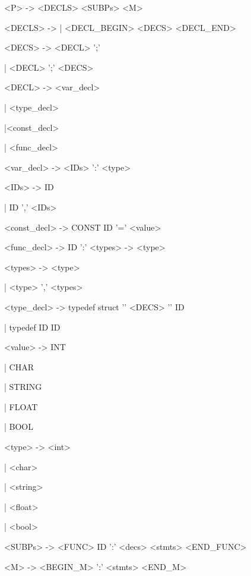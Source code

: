<P> -> <DECLS> <SUBPs> <M>

<DECLS> -> | <DECL\_BEGIN> <DECS> <DECL\_END>

<DECS> -> <DECL> ';' 

\hspace{2cm}| <DECL> ';' <DECS>

<DECL> -> <var\_decl> 

\hspace{2cm}| <type\_decl> 

\hspace{2cm}|<const\_decl> 

\hspace{2cm}| <func\_decl> 


<var\_decl> ->  <IDs> ':' <type> 

<IDs> -> ID 

\hspace{2cm}| ID ',' <IDs>

<const\_decl> -> CONST ID '=' <value> 

<func\_decl> -> ID ':' <types> -> <type> 

<types> -> <type>

\hspace{2cm}| <type> ',' <types> 

<type\_decl> -> typedef struct '{' <DECS> '}' ID 

\hspace{2cm}| typedef ID ID

<value> -> INT 

\hspace{2cm}| CHAR 

\hspace{2cm}| STRING 

\hspace{2cm}| FLOAT 

\hspace{2cm}| BOOL 

<type> -> <int> 

\hspace{2cm}| <char> 

\hspace{2cm}| <string> 

\hspace{2cm}| <float> 

\hspace{2cm}| <bool>

<SUBPs> -> <FUNC> ID ':' <decs> <stmts> <END\_FUNC>

<M> -> <BEGIN\_M> ':' <stmts> <END\_M>


